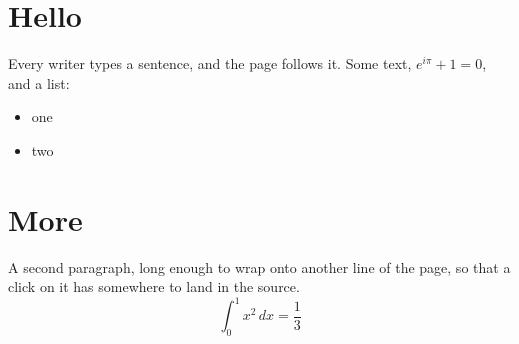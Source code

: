 \documentclass{article}
\begin{document}
\section{Hello}
Every writer types a sentence, and the page follows it. Some text, $e^{i\pi}+1=0$, and a list:
\begin{itemize}\item one\item two\end{itemize}
\section{More}
A second paragraph, long enough to wrap onto another line of the page, so
that a click on it has somewhere to land in the source.
\begin{equation}
  \int_0^1 x^2\,dx = \frac{1}{3}
\end{equation}
\end{document}

